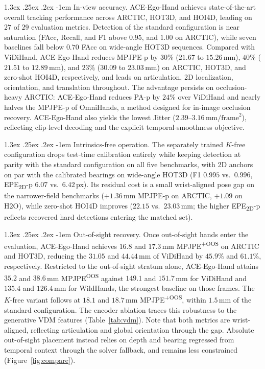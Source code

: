 \documentclass[10pt,twocolumn,letterpaper]{article}
\makeatletter
\renewcommand\paragraph{\@startsection{paragraph}{4}{\z@}%
  {1.3ex \@plus .25ex \@minus .2ex}%
  {-1em}%
  {\normalfont\normalsize\bfseries}}
\newcommand{\method}{ACE-Ego-Hand} %
\makeatother
\begin{document}
\paragraph{In-view accuracy.}
\method{} achieves state-of-the-art overall tracking performance across ARCTIC, HOT3D, and HOI4D, leading on $27$ of $29$ evaluation metrics. Detection of the standard configuration is near saturation (FAcc, Recall, and F1 above $0.95$, and $1.00$ on ARCTIC), while seven baselines fall below $0.70$ FAcc on wide-angle HOT3D sequences. Compared with ViDiHand, \method{} reduces MPJPE-p by $30\%$ ($21.67$ to $15.26$\,mm), $40\%$ ($21.51$ to $12.89$\,mm), and $23\%$ ($30.09$ to $23.03$\,mm) on ARCTIC, HOT3D, and zero-shot HOI4D, respectively, and leads on articulation, 2D localization, orientation, and translation throughout. The advantage persists on occlusion-heavy ARCTIC: \method{} reduces PA-p by $24\%$ over ViDiHand and nearly halves the MPJPE-p of OmniHands, a method designed for in-image occlusion recovery. \method{} also yields the lowest Jitter ($2.39$--$3.16\,\mathrm{mm}/\mathrm{frame}^2$), reflecting clip-level decoding and the explicit temporal-smoothness objective.

\paragraph{Intrinsics-free operation.}
The separately trained $K$-free configuration drops test-time calibration entirely while keeping detection at parity with the standard configuration on all five benchmarks, with 2D anchors on par with the calibrated bearings on wide-angle HOT3D (F1 $0.995$ vs.\ $0.996$, EPE\textsubscript{2D}-p $6.07$ vs.\ $6.42$\,px). Its residual cost is a small wrist-aligned pose gap on the narrower-field benchmarks ($+1.36$\,mm MPJPE-p on ARCTIC, $+1.09$ on H2O), while zero-shot HOI4D improves ($22.15$ vs.\ $23.03$\,mm; the higher EPE\textsubscript{2D}-p reflects recovered hard detections entering the matched set).

\paragraph{Out-of-sight recovery.}
Once out-of-sight hands enter the evaluation, \method{} achieves $16.8$ and $17.3$\,mm MPJPE\textsuperscript{+OOS} on ARCTIC and HOT3D, reducing the $31.05$ and $44.44$\,mm of ViDiHand by $45.9\%$ and $61.1\%$, respectively. Restricted to the out-of-sight stratum alone, \method{} attains $35.2$ and $38.6$\,mm MPJPE\textsuperscript{OOS} against $149.1$ and $151.7$\,mm for ViDiHand and $135.4$ and $126.4$\,mm for WildHands, the strongest baseline on those frames. The $K$-free variant follows at $18.1$ and $18.7$\,mm MPJPE\textsuperscript{+OOS}, within $1.5$\,mm of the standard configuration. The encoder ablation traces this robustness to the generative VDM features (Table~\ref{tab:vdm}). Note that both metrics are wrist-aligned, reflecting articulation and global orientation through the gap. Absolute out-of-sight placement instead relies on depth and bearing regressed from temporal context through the solver fallback, and remains less constrained (Figure~\ref{fig:compare}).
\end{document}
